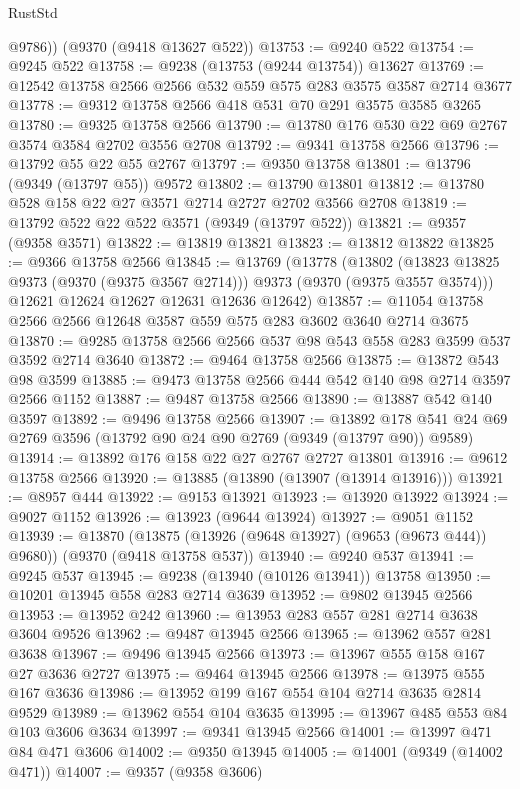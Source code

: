 \begin{lexlean}{RustStd}
\begin{coremodule}
{\begin{coremodule}
{{{{{{{{{{{{{{{{{{{{{{{{{{{{{{{{{{{{{{{        @9786))
    (@9370 (@9418 @13627 @522))
@13753 := @9240 @522
@13754 := @9245 @522
@13758 := @9238 (@13753 (@9244 @13754)) @13627
@13769 := @12542 @13758 @2566 @2566 @532 @559 @575 @283 @3575 @3587 @2714 @3677
@13778 := @9312 @13758 @2566 @418 @531 @70 @291 @3575 @3585 @3265
@13780 := @9325 @13758 @2566
@13790 := @13780 @176 @530 @22 @69 @2767 @3574 @3584 @2702 @3556 @2708
@13792 := @9341 @13758 @2566
@13796 := @13792 @55 @22 @55 @2767
@13797 := @9350 @13758
@13801 := @13796 (@9349 (@13797 @55)) @9572
@13802 := @13790 @13801
@13812 := @13780 @528 @158 @22 @27 @3571 @2714 @2727 @2702 @3566 @2708
@13819 := @13792 @522 @22 @522 @3571 (@9349 (@13797 @522))
@13821 := @9357 (@9358 @3571)
@13822 := @13819 @13821
@13823 := @13812 @13822
@13825 := @9366 @13758 @2566
@13845 := @13769
    (@13778
      (@13802 (@13823 @13825 @9373 (@9370 (@9375 @3567 @2714))) @9373 (@9370 (@9375 @3557 @3574)))
      @12621
      @12624
      @12627
      @12631
      @12636
      @12642)
@13857 := @11054 @13758 @2566 @2566 @12648 @3587 @559 @575 @283 @3602 @3640 @2714 @3675
@13870 := @9285 @13758 @2566 @2566 @537 @98 @543 @558 @283 @3599 @537 @3592 @2714 @3640
@13872 := @9464 @13758 @2566
@13875 := @13872 @543 @98 @3599
@13885 := @9473 @13758 @2566 @444 @542 @140 @98 @2714 @3597 @2566 @1152
@13887 := @9487 @13758 @2566
@13890 := @13887 @542 @140 @3597
@13892 := @9496 @13758 @2566
@13907 := @13892 @178 @541 @24 @69 @2769 @3596 (@13792 @90 @24 @90 @2769 (@9349 (@13797 @90)) @9589)
@13914 := @13892 @176 @158 @22 @27 @2767 @2727 @13801
@13916 := @9612 @13758 @2566
@13920 := @13885 (@13890 (@13907 (@13914 @13916)))
@13921 := @8957 @444
@13922 := @9153 @13921
@13923 := @13920 @13922
@13924 := @9027 @1152
@13926 := @13923 (@9644 @13924)
@13927 := @9051 @1152
@13939 := @13870
    (@13875 (@13926 (@9648 @13927) (@9653 (@9673 @444)) @9680))
    (@9370 (@9418 @13758 @537))
@13940 := @9240 @537
@13941 := @9245 @537
@13945 := @9238 (@13940 (@10126 @13941)) @13758
@13950 := @10201 @13945 @558 @283 @2714 @3639
@13952 := @9802 @13945 @2566
@13953 := @13952 @242
@13960 := @13953 @283 @557 @281 @2714 @3638 @3604 @9526
@13962 := @9487 @13945 @2566
@13965 := @13962 @557 @281 @3638
@13967 := @9496 @13945 @2566
@13973 := @13967 @555 @158 @167 @27 @3636 @2727
@13975 := @9464 @13945 @2566
@13978 := @13975 @555 @167 @3636
@13986 := @13952 @199 @167 @554 @104 @2714 @3635 @2814 @9529
@13989 := @13962 @554 @104 @3635
@13995 := @13967 @485 @553 @84 @103 @3606 @3634
@13997 := @9341 @13945 @2566
@14001 := @13997 @471 @84 @471 @3606
@14002 := @9350 @13945
@14005 := @14001 (@9349 (@14002 @471))
@14007 := @9357 (@9358 @3606)
}}}}}}}}}}}}}}}}}}}}}}}}}}}}}}}}}}}}}}}
\end{coremodule}}
\end{coremodule}
\end{lexlean}
